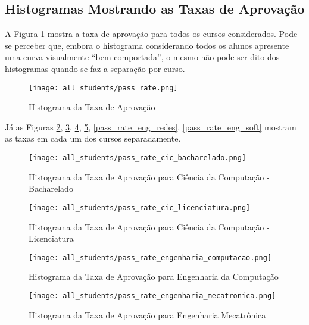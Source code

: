 \subsection{Histogramas Mostrando as Taxas de Aprovação}
A Figura \ref{pass_rate_all} mostra a taxa de aprovação para todos os cursos
considerados. 
Pode-se perceber que, embora o histograma considerando todos os alunos apresente uma
curva visualmente ``bem comportada'', o mesmo não pode ser dito dos histogramas
quando se faz a separação por curso.  

\begin{figure}[!ht]
    \caption{Histograma da Taxa de Aprovação}
    \centering
    \texttt{[image: all\_students/pass\_rate.png]}
    \label{pass_rate_all}
\end{figure}

Já as Figuras \ref{pass_rate_cic_b}, \ref{pass_rate_cic_lic},
\ref{pass_rate_eng_comp}, \ref{pass_rate_eng_mectr}, \ref{pass_rate_eng_redes},
\ref{pass_rate_eng_soft} mostram as taxas em cada um dos cursos separadamente. 

\begin{figure}[!ht]
    \caption{Histograma da Taxa de Aprovação para Ciência da Computação - Bacharelado}
    \centering
    \texttt{[image: all\_students/pass\_rate\_cic\_bacharelado.png]}
    \label{pass_rate_cic_b}
\end{figure}

\begin{figure}[!ht]
    \caption{Histograma da Taxa de Aprovação para Ciência da Computação -
    Licenciatura}
    \centering
    \texttt{[image: all\_students/pass\_rate\_cic\_licenciatura.png]}
    \label{pass_rate_cic_lic}
\end{figure}

\begin{figure}[!ht]
    \caption{Histograma da Taxa de Aprovação para Engenharia da Computação}
    \centering
    \texttt{[image: all\_students/pass\_rate\_engenharia\_computacao.png]}
    \label{pass_rate_eng_comp}
\end{figure}

\begin{figure}[!ht]
    \caption{Histograma da Taxa de Aprovação para Engenharia Mecatrônica}
    \centering
    \texttt{[image: all\_students/pass\_rate\_engenharia\_mecatronica.png]}
    \label{pass_rate_eng_mectr}
\end{figure}

